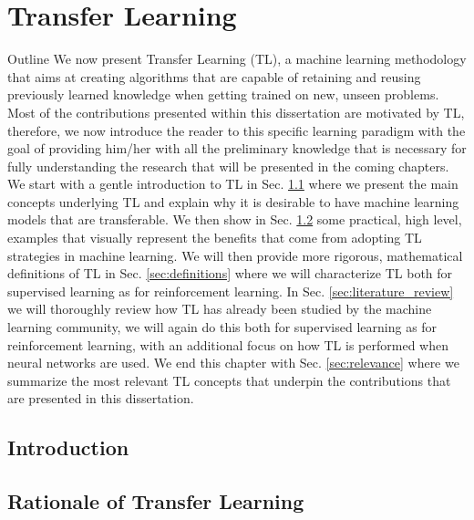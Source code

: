 \chapter{Transfer Learning}
\label{ch:transfer_learnimg}

\begin{remark}{Outline}
	We now present Transfer Learning (TL), a machine learning methodology that aims at creating algorithms that are capable of retaining and reusing previously learned knowledge when getting trained on new, unseen problems. Most of the contributions presented within this dissertation are motivated by TL, therefore, we now introduce the reader to this specific learning paradigm with the goal of providing him/her with all the preliminary knowledge that is necessary for fully understanding the research that will be presented in the coming chapters. We start with a gentle introduction to TL in Sec. \ref{sec:tl_introduction} where we present the main concepts underlying TL and explain why it is desirable to have machine learning models that are transferable. We then show in Sec. \ref{sec:rationale} some practical, high level, examples that visually represent the benefits that come from adopting TL strategies in machine learning. We will then provide more rigorous, mathematical definitions of TL in Sec. \ref{sec:definitions} where we will characterize TL both for supervised learning as for reinforcement learning. In Sec. \ref{sec:literature_review} we will thoroughly review how TL has already been studied by the machine learning community, we will again do this both for supervised learning as for reinforcement learning, with an additional focus on how TL is performed when neural networks are used. We end this chapter with Sec. \ref{sec:relevance} where we summarize the most relevant TL concepts that underpin the contributions that are presented in this dissertation.  
\end{remark}

\section{Introduction}
\label{sec:tl_introduction}


\section{Rationale of Transfer Learning}
\label{sec:rationale}

